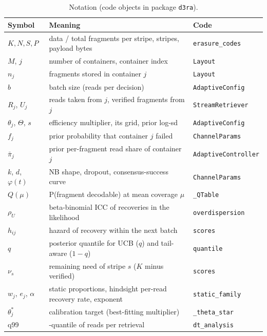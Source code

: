 \begin{table}[!t]
\centering
\caption{Notation (code objects in package \texttt{d3ra}).}
\label{tab:notation}
\scriptsize
\setlength{\tabcolsep}{3pt}
\begin{tabular}{@{}>{\raggedright\arraybackslash}p{13mm}>{\raggedright\arraybackslash}p{44mm}>{\raggedright\arraybackslash}p{26mm}@{}}
\toprule
Symbol & Meaning & Code \\
\midrule
$K,N,S,P$ & data / total fragments per stripe, stripes, payload bytes & \texttt{erasure\_codes} \\
$M$, $j$ & number of containers, container index & \texttt{Layout} \\
$n_j$ & fragments stored in container $j$ & \texttt{Layout} \\
$b$ & batch size (reads per decision) & \texttt{AdaptiveConfig} \\
$R_j$, $U_j$ & reads taken from $j$, verified fragments from $j$ & \texttt{StreamRetriever} \\
$\theta_j$, $\Theta$, $s$ & efficiency multiplier, its grid, prior log-sd & \texttt{AdaptiveConfig} \\
$f_j$ & prior probability that container $j$ failed & \texttt{ChannelParams} \\
$\bar\pi_j$ & prior per-fragment read share of container $j$ & \texttt{Adaptive}\allowbreak\texttt{Controller} \\
$k$, $d$, $\varphi(t)$ & NB shape, dropout, consensus-success curve & \texttt{ChannelParams} \\
$Q(\mu)$ & P(fragment decodable) at mean coverage $\mu$ & \texttt{\_QTable} \\
$\rho_U$ & beta-binomial ICC of recoveries in the likelihood & \texttt{overdispersion} \\
$h_{ij}$ & hazard of recovery within the next batch & \texttt{scores} \\
$q$ & posterior quantile for UCB ($q$) and tail-aware ($1{-}q$) & \texttt{quantile} \\
$\nu_s$ & remaining need of stripe $s$ ($K$ minus verified) & \texttt{scores} \\
$w_j$, $e_j$, $\alpha$ & static proportions, hindsight per-read recovery rate, exponent & \texttt{static\_family} \\
$\theta^\ast_j$ & calibration target (best-fitting multiplier) & \texttt{\_theta\_star} \\
q99 & 0.99-quantile of reads per retrieval & \texttt{dt\_analysis} \\
\bottomrule
\end{tabular}
\end{table}
